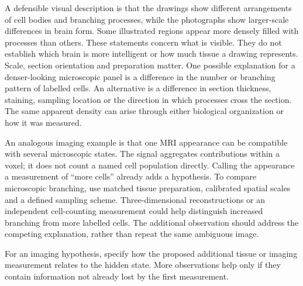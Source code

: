 \biomedicalanswer
{}
A defensible visual description is that the drawings show different arrangements of cell bodies and branching processes, while the photographs show larger-scale differences in brain form. Some illustrated regions appear more densely filled with processes than others. These statements concern what is visible. They do not establish which brain is more intelligent or how much tissue a drawing represents. Scale, section orientation and preparation matter.
One possible explanation for a denser-looking microscopic panel is a difference in the number or branching pattern of labelled cells. An alternative is a difference in section thickness, staining, sampling location or the direction in which processes cross the section. The same apparent density can arise through either biological organization or how it was measured.

An analogous imaging example is that one MRI appearance can be compatible with several microscopic states. The signal aggregates contributions within a voxel; it does not count a named cell population directly. Calling the appearance a measurement of ``more cells'' already adds a hypothesis.
To compare microscopic branching, use matched tissue preparation, calibrated spatial scales and a defined sampling scheme. Three-dimensional reconstructions or an independent cell-counting measurement could help distinguish increased branching from more labelled cells. The additional observation should address the competing explanation, rather than repeat the same ambiguous image.

For an imaging hypothesis, specify how the proposed additional tissue or imaging measurement relates to the hidden state. More observations help only if they contain information not already lost by the first measurement.

